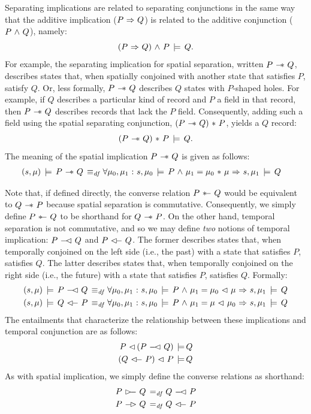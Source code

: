 \documentclass[11pt]{report}         %
\begin{document}
Separating implications are related to separating conjunctions in the same way that the additive implication ($P \operatorname{\,\Rightarrow\,} Q$) is related to the additive conjunction ($P \operatorname{\,\wedge\,} Q$), namely: \[ (P \operatorname{\,\Rightarrow\,} Q) \operatorname{\,\wedge\,} P \,\models\, Q.\] For example, the separating implication for spatial separation, written $P \fsepi Q$, describes states that, when spatially conjoined with another state that satisfies $P$, satisfy $Q$. Or, less formally, $P \fsepi Q$ describes $Q$ states with $P$-shaped holes. For example, if $Q$ describes a particular kind of record and $P$ a field in that record, then $P \fsepi Q$ describes records that lack the $P$ field. Consequently, adding such a field using the spatial separating conjunction, $(P \fsepi Q) \fsep P$, yields a $Q$ record: \[ (P \fsepi Q) \fsep P \sentails Q.\] The meaning of the spatial implication $P \fsepi Q$ is given as follows: \begin{align*} (s,\mu) \sentails P \fsepi Q \iffdef & \forall \mu_0,\mu_1 \st s,\mu_0 \sentails P \conj \mu_1 = \mu_0 \fsep \mu \onlyif  s,\mu_1 \sentails Q \end{align*} 

Note that, if defined directly, the converse relation $P \fsepic Q$ would be equivalent to $Q \fsepi P$ because spatial separation is commutative. Consequently, we simply define $P \fsepic Q$ to be shorthand for $Q \fsepi P$. On the other hand, temporal separation is not commutative, and so we may define \emph{two} notions of temporal implication: $P \fseqli Q$ and $P \fseqri Q$. The former describes states that, when temporally conjoined on the left side (i.e., the past) with a state that satisfies $P$, satisfies $Q$. The latter describes states that, when temporally conjoined on the right side (i.e., the future) with a state that satisfies $P$, satisfies $Q$. Formally: \begin{align*} (s,\mu) \sentails P \fseqli Q \iffdef & \forall \mu_0,\mu_1 \st s,\mu_0 \sentails P \conj \mu_1 = \mu_0 \fseq \mu \onlyif  s,\mu_1 \sentails Q \\
(s,\mu) \sentails Q \fseqri P \iffdef & \forall \mu_0,\mu_1 \st s,\mu_0 \sentails P \conj \mu_1 = \mu \fseq \mu_0 \onlyif  s,\mu_1 \sentails Q \end{align*} The entailments that characterize the relationship between these implications and temporal conjunction are as follows: \begin{align*}
  P \fseq (P \fseqli Q) \sentails & Q \\ 
  (Q \fseqri P) \fseq P \sentails & Q \\ 
\end{align*} As with spatial implication, we simply define the converse relations as shorthand: \begin{align*}
  P \fseqlic Q \eqdef & Q \fseqli P \\
  P \fseqric Q \eqdef & Q \fseqri P \\
\end{align*}
\end{document}
